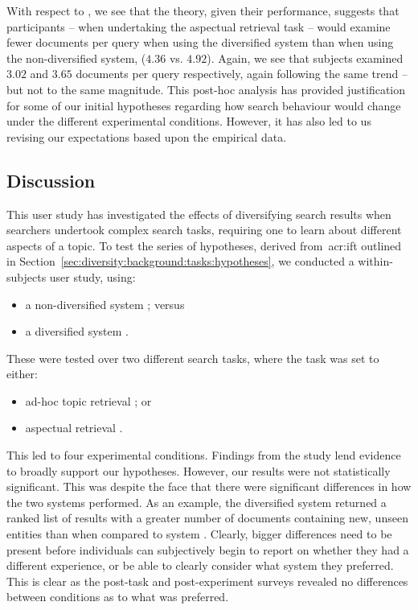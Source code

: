 With respect to , we see that the theory, given their performance, suggests that participants -- when undertaking the aspectual retrieval task -- would examine fewer documents per query when using the diversified system  than when using the non-diversified system,  ($4.36$ vs. $4.92$). Again, we see that subjects examined $3.02$ and $3.65$ documents per query respectively, again following the same trend -- but not to the same magnitude. This post-hoc analysis has provided justification for some of our initial hypotheses regarding how search behaviour would change under the different experimental conditions. However, it has also led to us revising our expectations based upon the empirical data.

\subsection{Discussion}
This user study has investigated the effects of diversifying search results when searchers undertook complex search tasks, requiring one to learn about different aspects of a topic. To test the series of hypotheses, derived from~\gls{acr:ift} outlined in Section~\ref{sec:diversity:background:tasks:hypotheses}, we conducted a within-subjects user study, using:

\begin{itemize}
    \item{a non-diversified system ; versus}
    \item{a diversified system .}
\end{itemize}

These were tested over two different search tasks, where the task was set to either:

\begin{itemize}
    \item{ad-hoc topic retrieval ; or}
    \item{aspectual retrieval .}
\end{itemize}

This led to four experimental conditions. Findings from the study lend evidence to broadly support our hypotheses. However, our results were not statistically significant. This was despite the face that there were significant differences in how the two systems performed. As an example, the diversified system  returned a ranked list of results with a greater number of documents containing new, unseen entities than when compared to system . Clearly, bigger differences need to be present before individuals can subjectively begin to report on whether they had a different experience, or be able to clearly consider what system they preferred. This is clear as the post-task and post-experiment surveys revealed no differences between conditions as to what was preferred.

